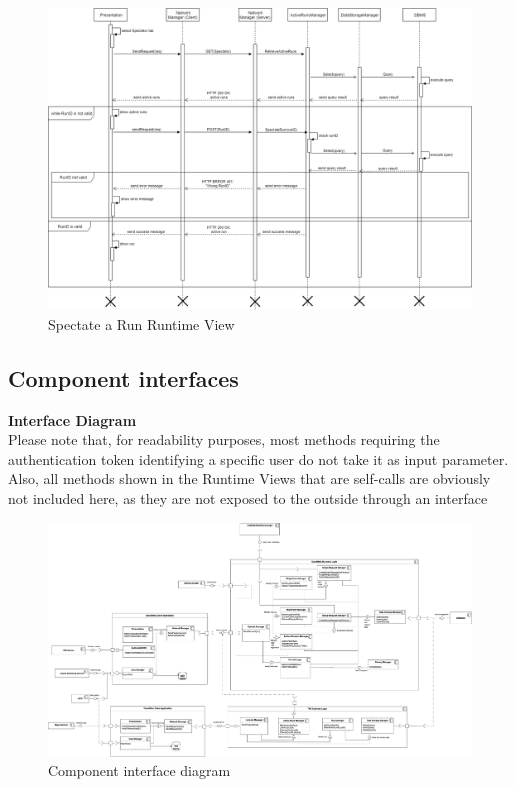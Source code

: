 \documentclass[titlepage]{article}
\begin{document}
	\begin{figure}[H]
		\center
		\includegraphics[width=15cm]{Spectate.png}
		\caption{Spectate a Run Runtime View}
		\label{fig:SPEC}
	\end{figure}
	
	\pagebreak
	
	
	
	\subsection{Component interfaces}
	
	{\bf Interface Diagram }\\ 
	Please note that, for readability purposes, most methods requiring the authentication token identifying a specific user do not take it as input parameter.
	Also, all methods shown in the Runtime Views that are self-calls are obviously not included here, as they are not exposed to the outside through an interface
	
	\begin{figure}[H]
		\center
		\includegraphics[width=15cm]{ComponentInterfaces.png}
		\caption{Component interface diagram}
		\label{fig:INT}
	\end{figure}
	
\end{document}
